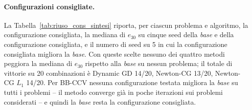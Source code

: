 \paragraph{Configurazioni consigliate.}
La Tabella~\ref{tab:riuso_cons_sintesi} riporta, per ciascun problema e
algoritmo, la configurazione consigliata, la mediana di $e_{30}$ su cinque seed
della \emph{base} e della configurazione consigliata, e il numero di seed su 5
in cui la configurazione consigliata migliora la \emph{base}. Con queste scelte
nessuno dei quattro metodi peggiora la mediana di $e_{30}$ rispetto alla
\emph{base} su nessun problema; il totale di vittorie su 20 combinazioni è
Dynamic GD 14/20, Newton-CG 13/20, Newton-CG $L_1$ 14/20. Per BB-CCV nessuna
configurazione testata migliora la \emph{base} su tutti i problemi -- il metodo
converge già in poche iterazioni sui problemi considerati -- e quindi la
\emph{base} resta la configurazione consigliata.

